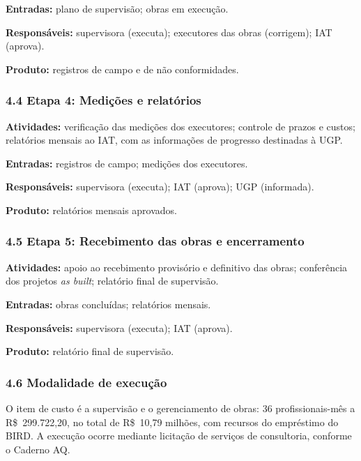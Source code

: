 \textbf{Entradas:} plano de supervisão; obras em execução.

\textbf{Responsáveis:} supervisora (executa); executores das obras (corrigem); IAT (aprova).

\textbf{Produto:} registros de campo e de não conformidades.

\subsubsection*{4.4 Etapa 4: Medições e relatórios}

\textbf{Atividades:} verificação das medições dos executores; controle de prazos e custos; relatórios mensais ao IAT, com as informações de progresso destinadas à UGP.

\textbf{Entradas:} registros de campo; medições dos executores.

\textbf{Responsáveis:} supervisora (executa); IAT (aprova); UGP (informada).

\textbf{Produto:} relatórios mensais aprovados.

\subsubsection*{4.5 Etapa 5: Recebimento das obras e encerramento}

\textbf{Atividades:} apoio ao recebimento provisório e definitivo das obras; conferência dos projetos \textit{as built}; relatório final de supervisão.

\textbf{Entradas:} obras concluídas; relatórios mensais.

\textbf{Responsáveis:} supervisora (executa); IAT (aprova).

\textbf{Produto:} relatório final de supervisão.

\subsubsection*{4.6 Modalidade de execução}

O item de custo é a supervisão e o gerenciamento de obras: 36 profissionais-mês a R\$~299.722,20, no total de R\$~10,79 milhões, com recursos do empréstimo do BIRD. A execução ocorre mediante licitação de serviços de consultoria, conforme o Caderno AQ.


